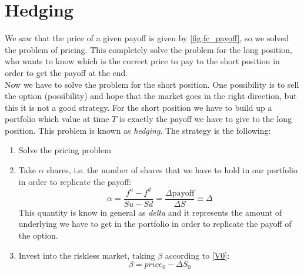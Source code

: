 \section{Hedging}
We saw that the price of a given payoff is given by \eqref{fig:fc_payoff}, so we solved the problem of pricing. This completely solve the problem for the long position, who wants to know which is the correct price to pay to the short position in order to get the payoff at the end. \\
Now we have to solve the problem for the short position. One possibility is to sell the option (possibility) and hope that the market goes in the right direction, but this it is not a good strategy. For the short position we have to build up a portfolio which value at time $T$ is exactly the payoff we have to give to the long position. This problem is known as \emph{hedging}. The strategy is the following:
\begin{enumerate}
    \item Solve the pricing problem
    \item Take $\alpha$ shares, i.e. the number of shares that we have to hold in our portfolio in order to replicate the payoff:
    \begin{equation}
        \alpha = \dfrac{f^u-f^d}{Su-Sd} =  \dfrac{\Delta\mbox{payoff}}{\Delta S} \equiv \Delta
    \end{equation}
    This quantity is know in general as \emph{delta} and it represents the amount of underlying we have to get in the portfolio in order to replicate the payoff of the option.
    \item Invest into the riskless market, taking $\beta$ according to \eqref{V0}:
    \begin{equation}
        \beta = price_0-\Delta S_0
    \end{equation}
\end{enumerate}
